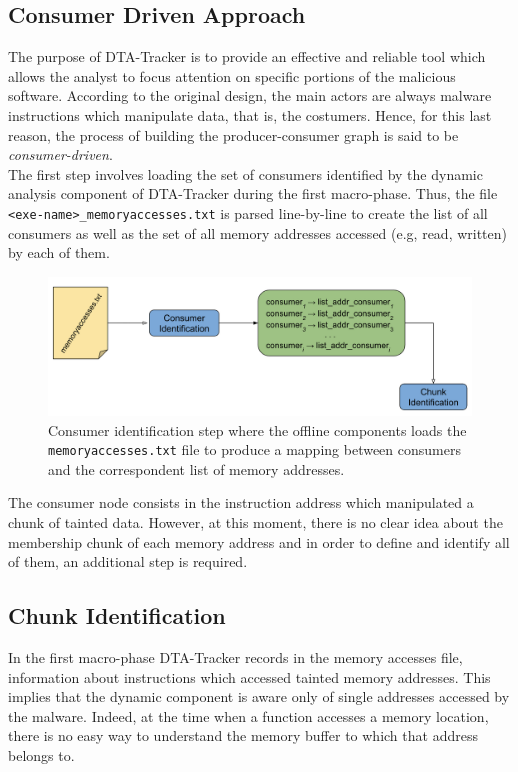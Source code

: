 \documentclass[LaM,binding=0.6cm]{sapthesis}
\begin{document}
\subsection{Consumer Driven Approach}
The purpose of DTA-Tracker is to provide an effective and reliable tool which allows the analyst to focus attention on specific portions of the malicious software. According to the original design, the main actors are always malware instructions which manipulate data, that is, the costumers. Hence, for this last reason, the process of building the producer-consumer graph is said to be \textit{consumer-driven}.\\

The first step involves loading the set of consumers identified by the dynamic analysis component of DTA-Tracker during the first macro-phase. Thus, the file \texttt{<exe-name>\_memoryaccesses.txt} is parsed line-by-line to create the list of all consumers as well as the set of all memory addresses accessed (e.g, read, written) by each of them.\\

\begin{figure}[h!]
\centering
\includegraphics[scale=.6]{images/dtatracker4}
\caption{Consumer identification step where the offline components loads the \texttt{memoryaccesses.txt} file to produce a mapping between consumers and the correspondent list of memory addresses.}
\end{figure}

The consumer node consists in the instruction address which manipulated a chunk of tainted data. However, at this moment, there is no clear idea about the membership chunk of each memory address and in order to define and identify all of them, an additional step is required.
\newpage
\subsection{Chunk Identification}
\label{subsec:chunkidentification}
In the first macro-phase DTA-Tracker records in the memory accesses file, information about instructions which accessed tainted memory addresses. This implies that the dynamic component is aware only of single addresses accessed by the malware. Indeed, at the time when a function accesses a memory location, there is no easy way to understand the memory buffer to which that address belongs to.\\
\end{document}
